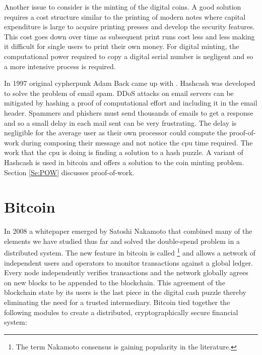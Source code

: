 Another issue to consider is the minting of the digital coins. A good solution requires a cost structure similar to the printing of modern notes where capital expenditure is large to acquire printing presses and develop the security features. This cost goes down over time as subsequent print runs cost less and less making it difficult for single users to print their own money. For digital minting, the computational power required to copy a digital serial number is negligent and so a more intensive process is required.

In 1997 original cypherpunk Adam Back came up with . Hashcash was developed to solve the problem of email spam. DDoS attacks on email servers can be mitigated by hashing a proof of computational effort and including it in the email header. Spammers and phishers must send thousands of emails to get a response and so a small delay in each mail sent can be very frustrating. The delay is negligible for the average user as their own processor could compute the proof-of-work during composing their message and not notice the cpu time required. The work that the cpu is doing is finding a solution to a hash puzzle. A variant of Hashcash is used in bitcoin and offers a solution to the coin minting problem. Section \ref{Se:POW} discusses proof-of-work.


\section{Bitcoin}\label{Se:bitcoin}
In 2008 a whitepaper emerged by Satoshi Nakamoto that combined many of the elements we have studied thus far and solved the double-spend problem in a distributed system. The new feature in bitcoin is called \footnote{The term Nakamoto consensus is gaining popularity in the literature.} and allows a network of independent users and operators to monitor transactions against a global ledger. Every node independently verifies transactions and the network globally agrees on new blocks to be appended to the blockchain. This agreement of the blockchain state by its users is the last piece in the digital cash puzzle thereby eliminating the need for a trusted intermediary. Bitcoin tied together the following modules to create a distributed, cryptographically secure financial system:


